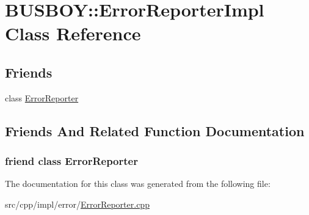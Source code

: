 \hypertarget{classBUSBOY_1_1ErrorReporterImpl}{
\section{BUSBOY::ErrorReporterImpl Class Reference}
\label{classBUSBOY_1_1ErrorReporterImpl}
}
\subsection*{Friends}
\begin{DoxyCompactItemize}
\item 
class \hyperlink{classBUSBOY_1_1ErrorReporterImpl_afa429d65976a60e46fd25971b5354067}{ErrorReporter}
\end{DoxyCompactItemize}


\subsection{Friends And Related Function Documentation}
\hypertarget{classBUSBOY_1_1ErrorReporterImpl_afa429d65976a60e46fd25971b5354067}{
\subsubsection[{ErrorReporter}]{\setlength{\rightskip}{0pt plus 5cm}friend class {\bf ErrorReporter}}}
\label{classBUSBOY_1_1ErrorReporterImpl_afa429d65976a60e46fd25971b5354067}


The documentation for this class was generated from the following file:\begin{DoxyCompactItemize}
\item 
src/cpp/impl/error/\hyperlink{ErrorReporter_8cpp}{ErrorReporter.cpp}\end{DoxyCompactItemize}
